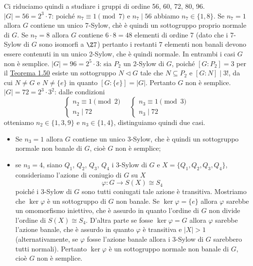 \documentclass[11pt]{scrartcl}
\begin{document}
Ci riduciamo quindi a studiare i gruppi di ordine 56, 60, 72, 80, 96.
\newline\newline
\underline{$|G| = 56 = 2^3\cdot 7$}: poiché $n_7 \equiv 1 \pmod 7$ e $n_7 \mid 56$ abbiamo
$n_7 \in \{1, 8\}$. Se $n_7 = 1$ allora $G$ contiene un unico 7-Sylow, chè 
è quindi un sottogruppo proprio normale di $G$. Se $n_7 = 8$ allora $G$ contiene
$6\cdot8 = 48$ elementi di ordine 7 (dato che i 7-Sylow di $G$ sono isomorfi a $\Z7$)
pertanto i restanti $7$ elementi non banali devono essere contenuti in un 
unico 2-Sylow, che è quindi normale. In entrambi i casi $G$ non è semplice.
\newline\newline
\underline{$|G| = 96 = 2^5\cdot 3$}: sia $P_2$ un 2-Sylow di $G$, poiché 
$[G:P_2] = 3$ per il \hyperref[teorema1.50]{Teorema 1.50} esiste un sottogruppo
$N \triangleleft G$ tale che $N \subseteq P_2$ e $[G:N] \mid 3!$, da cui
$N \neq G$ e $N \neq \{e\}$ in quanto $[G:\{e\}] = |G|$. Pertanto $G$ non 
è semplice.
\newline\newline
\underline{$|G| = 72 = 2^3 \cdot 3^2$}: dalle condizioni 
\[
    \begin{cases}
        n_2 \equiv 1 \pmod 2\\
        n_2 \mid 72
    \end{cases}\quad
    \begin{cases}
        n_3 \equiv 1 \pmod 3\\
        n_3 \mid 72
    \end{cases}
\]
otteniamo $n_2 \in \{1, 3, 9\}$ e $n_3 \in \{1, 4\}$, distinguiamo quindi
due casi.
\begin{itemize}
    \item Se $n_3 = 1$ allora $G$ contiene un unico 3-Sylow, che è quindi un
    sottogruppo normale non banale di $G$, cioè $G$ non è semplice;
    \item se $n_3= 4$, siano $Q_1$, $Q_2$, $Q_3$, $Q_4$ i 3-Sylow di $G$ e 
    $X = \{Q_1, Q_2, Q_3, Q_4\}$, consideriamo l'azione di coniugio di $G$ su $X$
    \[
        \varphi: G\longrightarrow S(X) \cong S_4
    \]
    poiché i 3-Sylow di $G$ sono tutti coniugati tale azione è transitiva.
    Mostriamo che $\ker \varphi$ è un sottogruppo di $G$ non banale. Se $\ker\varphi
    = \{e\}$ allora $\varphi$ sarebbe un omomorfismo iniettivo, che è assurdo
    in quanto l'ordine di $G$ non divide l'ordine di $S(X) \cong S_4$. D'altra
    parte se fosse $\ker\varphi = G$ allora $\varphi$ sarebbe l'azione banale,
    che è assurdo in quanto $\varphi$ è transitiva e $|X| > 1$ (alternativamente,
    se $\varphi$ fosse l'azione banale allora i 3-Sylow di $G$ sarebbero tutti
    normali). Pertanto $\ker\varphi$ è un sottogruppo normale non banale di $G$,
    cioè $G$ non è semplice.
\end{itemize}
\end{document}
